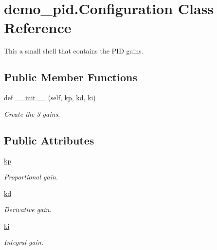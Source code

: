 \hypertarget{classdemo__pid_1_1Configuration}{}\section{demo\+\_\+pid.\+Configuration Class Reference}
\label{classdemo__pid_1_1Configuration}


This a small shell that contains the P\+ID gains.  


\subsection*{Public Member Functions}
\begin{DoxyCompactItemize}
\item 
def \hyperlink{classdemo__pid_1_1Configuration_a2b543ddee6f00d3363207e6a1ce0a2a6}{\+\_\+\+\_\+init\+\_\+\+\_\+} (self, \hyperlink{classdemo__pid_1_1Configuration_a41bebe94c285c00d9f0a536054ff0823}{kp}, \hyperlink{classdemo__pid_1_1Configuration_ac5fe23107d9e6c46271afff92749176f}{kd}, \hyperlink{classdemo__pid_1_1Configuration_aa6b6f403f267c691d9f44314f379b890}{ki})
\begin{DoxyCompactList}\small\item\em Create the 3 gains. \end{DoxyCompactList}\end{DoxyCompactItemize}
\subsection*{Public Attributes}
\begin{DoxyCompactItemize}
\item 
\hyperlink{classdemo__pid_1_1Configuration_a41bebe94c285c00d9f0a536054ff0823}{kp}
\begin{DoxyCompactList}\small\item\em Proportional gain. \end{DoxyCompactList}\item 
\hyperlink{classdemo__pid_1_1Configuration_ac5fe23107d9e6c46271afff92749176f}{kd}
\begin{DoxyCompactList}\small\item\em Derivative gain. \end{DoxyCompactList}\item 
\hyperlink{classdemo__pid_1_1Configuration_aa6b6f403f267c691d9f44314f379b890}{ki}
\begin{DoxyCompactList}\small\item\em Integral gain. \end{DoxyCompactList}\end{DoxyCompactItemize}


